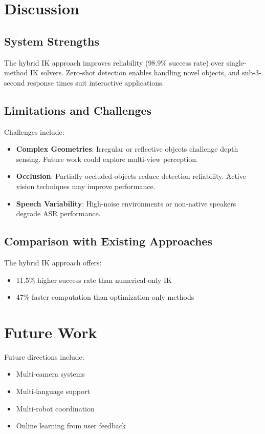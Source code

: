 \documentclass[conference]{IEEEtran}
\begin{document}
\section{Discussion}

\subsection{System Strengths}
The hybrid IK approach improves reliability (98.9\% success rate) over single-method IK solvers. Zero-shot detection enables handling novel objects, and sub-3-second response times suit interactive applications.

\subsection{Limitations and Challenges}
Challenges include:
\begin{itemize}
    \item \textbf{Complex Geometries}: Irregular or reflective objects challenge depth sensing. Future work could explore multi-view perception.
    \item \textbf{Occlusion}: Partially occluded objects reduce detection reliability. Active vision techniques may improve performance.
    \item \textbf{Speech Variability}: High-noise environments or non-native speakers degrade ASR performance.
\end{itemize}

\subsection{Comparison with Existing Approaches}
The hybrid IK approach offers:
\begin{itemize}
    \item 11.5\% higher success rate than numerical-only IK
    \item 47\% faster computation than optimization-only methods
\end{itemize}

\section{Future Work}
Future directions include:
\begin{itemize}
    \item Multi-camera systems
    \item Multi-language support
    \item Multi-robot coordination
    \item Online learning from user feedback
\end{itemize}
\end{document}
